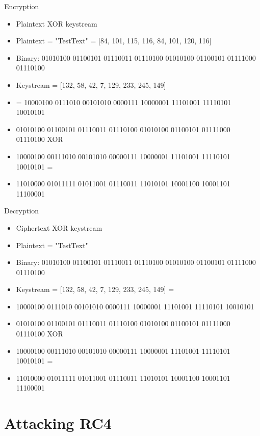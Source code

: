 \documentclass[
	aspectratio=169,	%
	onlytextwidth,		%
	t,					%
	]{beamer}
\begin{document}
\begin{frame}[fragile]{Encryption}
	\small
	\begin{itemize}
		\item Plaintext XOR keystream
		\item Plaintext = "TestText" = [84, 101, 115, 116, 84, 101, 120, 116]
		\item Binary: 01010100 01100101 01110011 01110100 01010100 01100101 01111000 01110100
		\item Keystream = [132, 58, 42, 7, 129, 233, 245, 149]
		\item = 10000100 0111010 00101010 0000111 10000001 11101001 11110101 10010101
		\item 01010100 01100101 01110011 01110100 01010100 01100101 01111000 01110100 XOR
		\item 10000100 00111010 00101010 00000111 10000001 11101001 11110101 10010101 = 
		\item 11010000 01011111 01011001 01110011 11010101 10001100 10001101 11100001
	\end{itemize}
	\normalsize
\end{frame}

\begin{frame}[fragile]{Decryption}
	\small
	\begin{itemize}
		\item Ciphertext XOR keystream
		\item Plaintext = "TestText"
		\item Binary: 01010100 01100101 01110011 01110100 01010100 01100101 01111000 01110100
		\item Keystream = [132, 58, 42, 7, 129, 233, 245, 149] =
		\item 10000100 0111010 00101010 0000111 10000001 11101001 11110101 10010101
		\item 01010100 01100101 01110011 01110100 01010100 01100101 01111000 01110100 XOR
		\item 10000100 00111010 00101010 00000111 10000001 11101001 11110101 10010101 = 
		\item 11010000 01011111 01011001 01110011 11010101 10001100 10001101 11100001
	\end{itemize}
	\normalsize
\end{frame}

\section{Attacking RC4}
\end{document}
